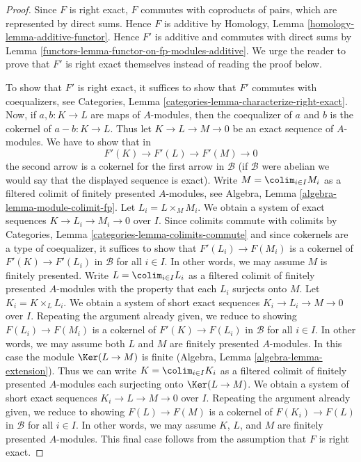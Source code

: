 \begin{proof}

Since $F$ is right exact, $F$ commutes with coproducts of pairs, which are
represented by direct sums. Hence $F$ is additive by
Homology, Lemma \ref{homology-lemma-additive-functor}.
Hence $F'$ is additive and commutes with direct sums by
Lemma \ref{functors-lemma-functor-on-fp-modules-additive}.
We urge the reader to prove that $F'$ is right exact themselves
instead of reading the proof below.

\medskip\noindent
To show that $F'$ is right exact, it suffices to show that $F'$ commutes
with coequalizers, see
Categories, Lemma \ref{categories-lemma-characterize-right-exact}.
Now, if $a, b : K \to L$ are maps of $A$-modules, then the
coequalizer of $a$ and $b$ is the cokernel of $a - b : K \to L$.
Thus let $K \to L \to M \to 0$ be an exact sequence
of $A$-modules. We have to show that in
$$
F'(K) \to F'(L) \to F'(M) \to 0
$$
the second arrow is a cokernel for the first arrow in $\mathcal{B}$
(if $\mathcal{B}$ were abelian we would say that the displayed sequence
is exact).
Write $M = \colim_{i \in I} M_i$ as a filtered colimit of finitely
presented $A$-modules, see
Algebra, Lemma \ref{algebra-lemma-module-colimit-fp}.
Let $L_i = L \times_M M_i$.
We obtain a system of exact sequences $K \to L_i \to M_i \to 0$ over $I$.
Since colimits commute with colimits by
Categories, Lemma \ref{categories-lemma-colimits-commute}
and since cokernels are a type of coequalizer,
it suffices to show that $F'(L_i) \to F(M_i)$ is a cokernel of
$F'(K) \to F'(L_i)$ in $\mathcal{B}$ for all $i \in I$. In other words, we may
assume $M$ is finitely presented. Write $L = \colim_{i \in I} L_i$
as a filtered colimit of finitely presented $A$-modules
with the property that each $L_i$ surjects onto $M$.
Let $K_i = K \times_L L_i$. We obtain a system of short exact sequences
$K_i \to L_i \to M \to 0$ over $I$.
Repeating the argument already given, we reduce to showing
$F(L_i) \to F(M_i)$ is a cokernel of
$F'(K) \to F(L_i)$ in $\mathcal{B}$ for all $i \in I$.
In other words, we may assume both
$L$ and $M$ are finitely presented $A$-modules.
In this case the module $\Ker(L \to M)$ is finite
(Algebra, Lemma \ref{algebra-lemma-extension}).
Thus we can write $K = \colim_{i \in I} K_i$ as a filtered colimit
of finitely presented $A$-modules each surjecting onto $\Ker(L \to M)$.
We obtain a system of short exact sequences
$K_i \to L \to M \to 0$ over $I$.
Repeating the argument already given, we reduce to showing
$F(L) \to F(M)$ is a cokernel of
$F(K_i) \to F(L)$ in $\mathcal{B}$ for all $i \in I$.
In other words, we may assume $K$, $L$, and $M$
are finitely presented $A$-modules. This final case follows
from the assumption that $F$ is right exact.
\end{proof}


